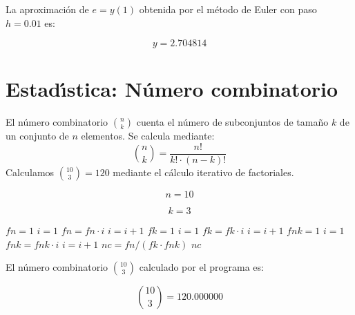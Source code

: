\documentclass{article}
\begin{document}
La aproximaci\'on de $e = y(1)$ obtenida por el m\'etodo de Euler con paso $h = 0.01$ es:

\begin{equation}
    y =
    2.704814
    \label{eq:res:y}
\end{equation}


\section{Estad\'{\i}stica: N\'umero combinatorio}

El n\'umero combinatorio $\binom{n}{k}$ cuenta el n\'umero de subconjuntos de tama\~no
$k$ de un conjunto de $n$ elementos. Se calcula mediante:
\[
    \binom{n}{k} = \frac{n!}{k! \cdot (n-k)!}
\]
Calculamos $\binom{10}{3} = 120$ mediante el c\'alculo iterativo de factoriales.

\begin{equation}
    n = 10
    \label{eq:calc:n}
\end{equation}

\begin{equation}
    k = 3
    \label{eq:calc:k}
\end{equation}

\begin{algorithm}
\caption{C\'alculo de $\binom{n}{k}$ mediante factoriales iterativos}
\label{alg:calc:nc}
\begin{algorithmic}
    \STATE $fn = 1$
    \STATE $i = 1$
        \STATE $fn = fn \cdot i$
        \STATE $i = i + 1$
    \ENDWHILE
    \STATE $fk = 1$
    \STATE $i = 1$
        \STATE $fk = fk \cdot i$
        \STATE $i = i + 1$
    \ENDWHILE
    \STATE $fnk = 1$
    \STATE $i = 1$
        \STATE $fnk = fnk \cdot i$
        \STATE $i = i + 1$
    \ENDWHILE
    \STATE $nc = fn / (fk \cdot fnk)$
    \RETURN $nc$
\end{algorithmic}
\end{algorithm}

El n\'umero combinatorio $\binom{10}{3}$ calculado por el programa es:

\begin{equation}
    \binom{10}{3} =
    120.000000
    \label{eq:res:nc}
\end{equation}
\end{document}
